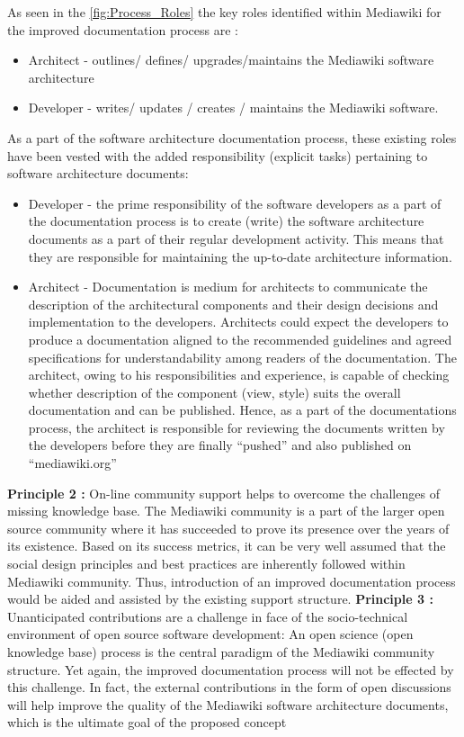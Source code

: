 As seen in the \autoref{fig:Process_Roles} the key roles identified within Mediawiki for the improved documentation process are :
\begin{itemize}
\item Architect - outlines/ defines/ upgrades/maintains the Mediawiki software architecture
\item Developer - writes/ updates / creates / maintains the Mediawiki software.
\end{itemize}
As a part of the software architecture documentation process, these existing roles have been vested with the added responsibility (explicit tasks) pertaining to software architecture documents:
\begin{itemize}
\item Developer - the prime responsibility of the software developers as a part of the documentation process is to create (write) the software architecture documents as a part of their regular development activity. This means that they are responsible for maintaining the up-to-date architecture information.
\item Architect - Documentation is medium for architects to communicate the description of the architectural components and their design decisions and implementation to the developers. Architects could expect the developers to produce a documentation aligned to the recommended guidelines and agreed specifications for understandability among readers of the documentation. The architect, owing to his responsibilities and experience, is capable of checking whether description of the component (view, style) suits the overall documentation and can be published. Hence, as a part of the documentations process, the architect is responsible for reviewing the documents written by the developers before they are finally \enquote{pushed} and also published on \enquote{mediawiki.org}

\end{itemize}

 \textbf{Principle 2 : }On-line community support helps to overcome the challenges of missing knowledge base.  
\indent The Mediawiki community is a part of the larger open source community where it has succeeded to prove its presence over the years of its existence. Based on its success metrics, it can be very well assumed that the social design principles and best practices are inherently followed within Mediawiki community. Thus, introduction of an improved documentation process would be aided and assisted by the existing support structure.
\newline \newline
\textbf{Principle 3 : } Unanticipated contributions are a challenge in face of the socio-technical environment of open source software development:
\indent An open science (open knowledge base) process is the central paradigm of the Mediawiki community structure. Yet again, the improved documentation process will not be effected by this challenge. In fact, the external contributions in the form of open discussions will help improve the quality of the Mediawiki software architecture documents, which is the ultimate goal of the proposed concept

